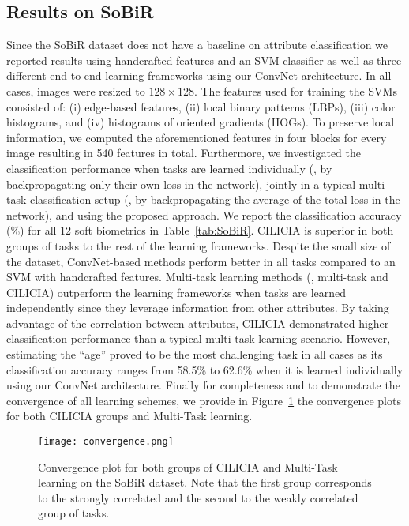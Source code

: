 \documentclass[10pt,twocolumn,letterpaper]{article}
\begin{document}
	\subsection{Results on SoBiR}
	Since the SoBiR dataset \cite{martinho2016soft} does not have a baseline on attribute classification we reported results using handcrafted features and an SVM classifier as well as three different end-to-end learning frameworks using our ConvNet architecture. In all cases, images were resized to \(128\times 128\). The features used for training the SVMs consisted of: (i) edge-based features, (ii) local binary patterns (LBPs), (iii) color histograms, and (iv) histograms of oriented gradients (HOGs). To preserve local information, we computed the aforementioned features in four blocks for every image resulting in 540 features in total. Furthermore, we investigated the classification performance when tasks are learned individually (\ie, by backpropagating only their own loss in the network), jointly in a typical multi-task classification setup (\ie, by backpropagating the average of the total loss in the network), and using the proposed approach.  We report the classification accuracy (\%) for all 12 soft biometrics in Table~\ref{tab:SoBiR}. CILICIA is superior in both groups of tasks to the rest of the learning frameworks. Despite the small size of the dataset, ConvNet-based methods perform better in all tasks compared to an SVM with handcrafted features. Multi-task learning methods (\ie, multi-task and CILICIA) outperform the learning frameworks when tasks are learned independently since they leverage information from other attributes. By taking advantage of the correlation between attributes, CILICIA demonstrated higher classification performance than a typical multi-task learning scenario. However, estimating the ``age'' proved to be the most challenging task in all cases as its classification accuracy ranges from 58.5\% to 62.6\% when it is learned individually using our ConvNet architecture. Finally for completeness and to demonstrate the convergence of all learning schemes, we provide in Figure~\ref{fig:converg} the convergence plots for both CILICIA groups and Multi-Task learning. 
	
	
	\begin{figure}[t] 
		\centering
		\texttt{[image: convergence.png]}
		\caption{Convergence plot for both groups of CILICIA and Multi-Task learning on the SoBiR dataset. Note that the first group corresponds to the strongly correlated and the second to the weakly correlated group of tasks.}
		\label{fig:converg}
	\end{figure}  
\end{document}

